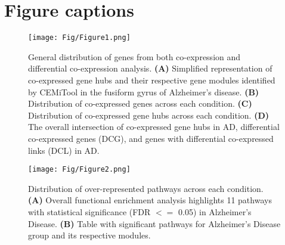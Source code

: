 \documentclass[utf8]{FrontiersinHarvard} %
\begin{document}



\section*{Figure captions}

\begin{figure}[!ht]
    \begin{center}
    \texttt{[image: Fig/Figure1.png]}
    \end{center}
    \caption{General distribution of genes from both co-expression and differential co-expression analysis. \textbf{(A)} Simplified representation of co-expressed gene hubs and their respective gene modules identified by CEMiTool in the fusiform gyrus of Alzheimer's disease. \textbf{(B)} Distribution of co-expressed genes across each condition. \textbf{(C)} Distribution of co-expressed gene hubs across each condition. \textbf{(D)} The overall intersection of co-expressed gene hubs in AD, differential co-expressed genes (DCG), and genes with differential co-expressed links (DCL) in AD.}
    \label{fig:figure1}
\end{figure}

\begin{figure}[!ht]
    \begin{center}
    \texttt{[image: Fig/Figure2.png]}
    \end{center}
    \caption{Distribution of over-represented pathways across each condition. \textbf{(A)} Overall functional enrichment analysis highlights 11 pathways with statistical significance (FDR $<=$ 0.05) in Alzheimer's Disease. \textbf{(B)} Table with significant pathways for Alzheimer's Disease group and its respective modules.}
    \label{fig:figure2}
\end{figure}
\end{document}
